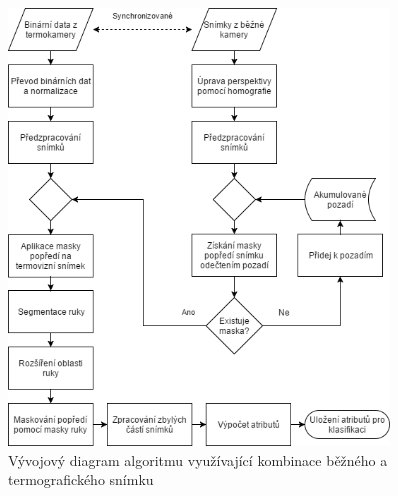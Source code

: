     \begin{figure}[h]
      \centering
      \includegraphics[width=0.9\textwidth]{images/visible_thermal_detection_diagram.png}
      \caption{Vývojový diagram algoritmu využívající kombinace běžného a termografického snímku}
      \label{fig:visible_thermal_detection_diagram}
    \end{figure} 


    



